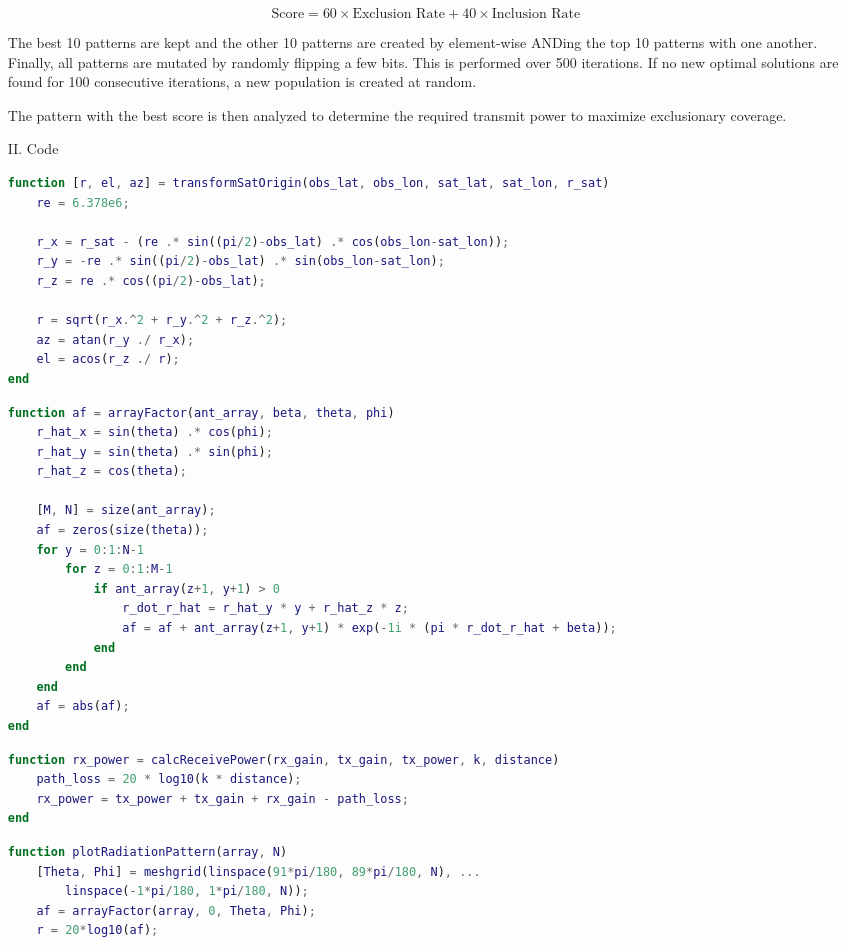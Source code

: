 \documentclass[12pt]{article}
\begin{document}
\begin{enumerate}
    \[\text{Score} = 60 \times \text{Exclusion Rate} + 40 \times \text{Inclusion Rate}\]

    The best 10 patterns are kept and the other 10 patterns are created by element-wise ANDing the top 10
    patterns with one another. Finally, all patterns are mutated by randomly flipping a few bits.
    This is performed over 500 iterations. If no new optimal solutions are found for 100 consecutive
    iterations, a new population is created at random.

    The pattern with the best score is then analyzed to determine the required transmit power 
    to maximize exclusionary coverage. 

    \item[II.] Code
    
    \begin{lstlisting}[language=matlab]
function [r, el, az] = transformSatOrigin(obs_lat, obs_lon, sat_lat, sat_lon, r_sat)
    re = 6.378e6;

    r_x = r_sat - (re .* sin((pi/2)-obs_lat) .* cos(obs_lon-sat_lon));
    r_y = -re .* sin((pi/2)-obs_lat) .* sin(obs_lon-sat_lon);
    r_z = re .* cos((pi/2)-obs_lat);
    
    r = sqrt(r_x.^2 + r_y.^2 + r_z.^2);
    az = atan(r_y ./ r_x);
    el = acos(r_z ./ r);
end
    \end{lstlisting}

    \begin{lstlisting}[language=matlab]
function af = arrayFactor(ant_array, beta, theta, phi)
    r_hat_x = sin(theta) .* cos(phi);
    r_hat_y = sin(theta) .* sin(phi);
    r_hat_z = cos(theta);

    [M, N] = size(ant_array);
    af = zeros(size(theta));
    for y = 0:1:N-1
        for z = 0:1:M-1
            if ant_array(z+1, y+1) > 0
                r_dot_r_hat = r_hat_y * y + r_hat_z * z;
                af = af + ant_array(z+1, y+1) * exp(-1i * (pi * r_dot_r_hat + beta));
            end
        end
    end
    af = abs(af);
end
    \end{lstlisting}

    \begin{lstlisting}[language=matlab]
function rx_power = calcReceivePower(rx_gain, tx_gain, tx_power, k, distance)
    path_loss = 20 * log10(k * distance);
    rx_power = tx_power + tx_gain + rx_gain - path_loss;
end
    \end{lstlisting}

    \begin{lstlisting}[language=matlab]
function plotRadiationPattern(array, N)
    [Theta, Phi] = meshgrid(linspace(91*pi/180, 89*pi/180, N), ...
        linspace(-1*pi/180, 1*pi/180, N));
    af = arrayFactor(array, 0, Theta, Phi);
    r = 20*log10(af);
    

\end{lstlisting}
\end{enumerate}
\end{document}
